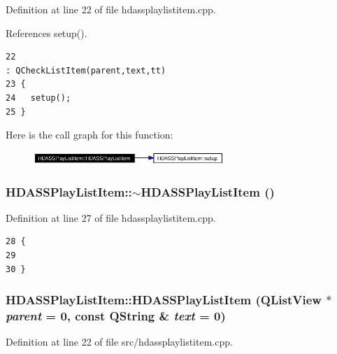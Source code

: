 Definition at line 22 of file hdassplaylistitem.cpp.

References setup().



\footnotesize\begin{verbatim}22                                                                                         : QCheckListItem(parent,text,tt)
23 {
24   setup();
25 }
\end{verbatim}\normalsize 


Here is the call graph for this function:\begin{figure}[H]
\begin{center}
\leavevmode
\includegraphics[width=204pt]{classHDASSPlayListItem_HDASSPlayListItema0_cgraph}
\end{center}
\end{figure}
\subsubsection{\setlength{\rightskip}{0pt plus 5cm}HDASSPlay\-List\-Item::$\sim${\bf HDASSPlay\-List\-Item} ()}\label{classHDASSPlayListItem_HDASSPlayListItema1}




Definition at line 27 of file hdassplaylistitem.cpp.



\footnotesize\begin{verbatim}28 {
29 
30 }
\end{verbatim}\normalsize 
{}
\subsubsection{\setlength{\rightskip}{0pt plus 5cm}HDASSPlay\-List\-Item::HDASSPlay\-List\-Item (QList\-View $\ast$ {\em parent} = 0, const QString \& {\em text} = 0)}\label{classHDASSPlayListItem_HDASSPlayListItema3}




Definition at line 22 of file src/hdassplaylistitem.cpp.

